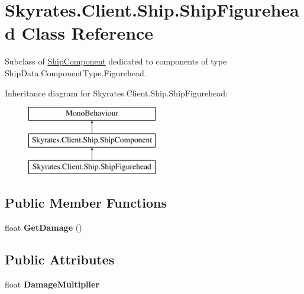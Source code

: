 \hypertarget{class_skyrates_1_1_client_1_1_ship_1_1_ship_figurehead}{\section{Skyrates.\-Client.\-Ship.\-Ship\-Figurehead Class Reference}
\label{class_skyrates_1_1_client_1_1_ship_1_1_ship_figurehead}
}


Subclass of \hyperlink{class_skyrates_1_1_client_1_1_ship_1_1_ship_component}{Ship\-Component} dedicated to components of type Ship\-Data.\-Component\-Type.\-Figurehead.  


Inheritance diagram for Skyrates.\-Client.\-Ship.\-Ship\-Figurehead\-:\begin{figure}[H]
\begin{center}
\leavevmode
\includegraphics[height=3.000000cm]{class_skyrates_1_1_client_1_1_ship_1_1_ship_figurehead}
\end{center}
\end{figure}
\subsection*{Public Member Functions}
\begin{DoxyCompactItemize}
\item 
\hypertarget{class_skyrates_1_1_client_1_1_ship_1_1_ship_figurehead_afe8df9d720684a3940b9659ae0f53245}{float {\bfseries Get\-Damage} ()}\label{class_skyrates_1_1_client_1_1_ship_1_1_ship_figurehead_afe8df9d720684a3940b9659ae0f53245}

\end{DoxyCompactItemize}
\subsection*{Public Attributes}
\begin{DoxyCompactItemize}
\item 
\hypertarget{class_skyrates_1_1_client_1_1_ship_1_1_ship_figurehead_a9b15c44c0bec1068256c9417b3be6282}{float {\bfseries Damage\-Multiplier}}\label{class_skyrates_1_1_client_1_1_ship_1_1_ship_figurehead_a9b15c44c0bec1068256c9417b3be6282}

\end{DoxyCompactItemize}



